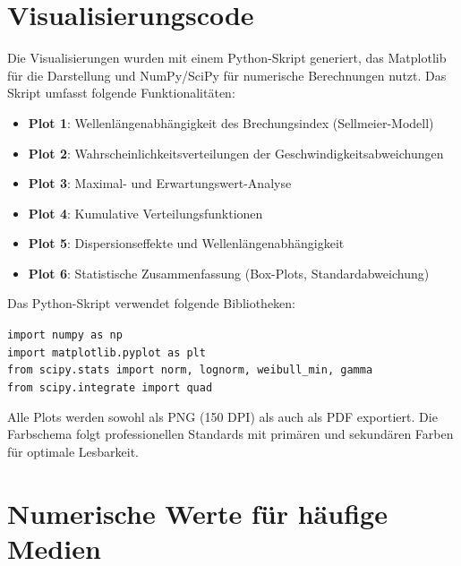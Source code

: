 \documentclass[12pt,a4paper,oneside]{article}
\theoremstyle{definition}
\theoremstyle{remark}
\begin{document}
\appendix

\section{Visualisierungscode}

Die Visualisierungen wurden mit einem Python-Skript generiert, das Matplotlib für die Darstellung und NumPy/SciPy für numerische Berechnungen nutzt. Das Skript umfasst folgende Funktionalitäten:

\begin{itemize}
    \item \textbf{Plot 1}: Wellenlängenabhängigkeit des Brechungsindex (Sellmeier-Modell)
    \item \textbf{Plot 2}: Wahrscheinlichkeitsverteilungen der Geschwindigkeitsabweichungen
    \item \textbf{Plot 3}: Maximal- und Erwartungswert-Analyse
    \item \textbf{Plot 4}: Kumulative Verteilungsfunktionen
    \item \textbf{Plot 5}: Dispersionseffekte und Wellenlängenabhängigkeit
    \item \textbf{Plot 6}: Statistische Zusammenfassung (Box-Plots, Standardabweichung)
\end{itemize}

Das Python-Skript verwendet folgende Bibliotheken:

\texttt{import numpy as np}\\
\texttt{import matplotlib.pyplot as plt}\\
\texttt{from scipy.stats import norm, lognorm, weibull\_min, gamma}\\
\texttt{from scipy.integrate import quad}

Alle Plots werden sowohl als PNG (150 DPI) als auch als PDF exportiert. Die Farbschema folgt professionellen Standards mit primären und sekundären Farben für optimale Lesbarkeit.

\section{Numerische Werte für häufige Medien}
\end{document}
